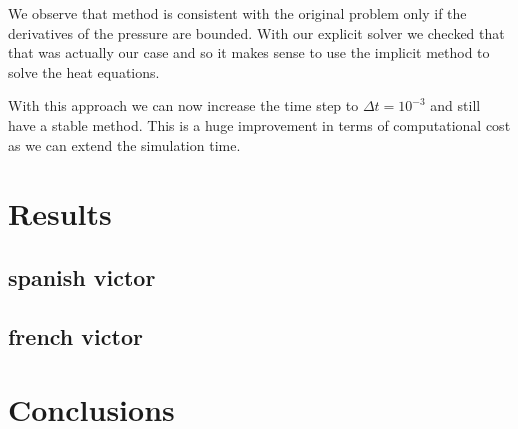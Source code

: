 \documentclass{article}
\begin{document}
We observe that method is consistent with the original problem only if the derivatives of the pressure are bounded. With our explicit solver we checked that that was actually our case and so it makes sense to use the implicit method to solve the heat equations.

With this approach we can now increase the time step to $\Delta t = 10^{-3}$ and still have a stable method. This is a huge improvement in terms of computational cost as we can extend the simulation time.

\section{Results}

\subsection{spanish victor}

\subsection{french victor}

\section{Conclusions}
\end{document}

